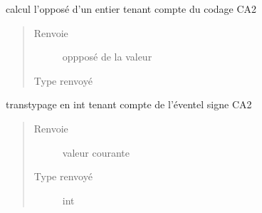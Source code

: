 \documentclass[letterpaper,10pt,french]{sphinxmanual}
\begin{document}
\begin{fulllineitems}
\begin{fulllineitems}
\begin{quote}
\begin{description}
\end{description}\end{quote}

\end{fulllineitems}


\begin{fulllineitems}
\label{\detokenize{executeurcomponents:executeurcomponents.DataValue.opposite}}
calcul l’opposé d’un entier tenant compte du codage CA2
\begin{quote}\begin{description}
\item[{Renvoie}] \leavevmode
oppposé de la valeur

\item[{Type renvoyé}] \leavevmode
{\hyperref[\detokenize{executeurcomponents:executeurcomponents.DataValue}]{}}

\end{description}\end{quote}

\end{fulllineitems}


\begin{fulllineitems}
\label{\detokenize{executeurcomponents:executeurcomponents.DataValue.toSignInt}}
transtypage en int tenant compte de l’éventel signe CA2
\begin{quote}\begin{description}
\item[{Renvoie}] \leavevmode
valeur courante

\item[{Type renvoyé}] \leavevmode
int

\end{description}\end{quote}

\end{fulllineitems}



\end{fulllineitems}
\end{document}

